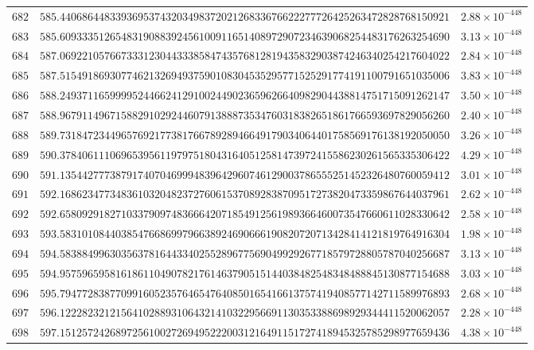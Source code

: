 \documentclass[12pt,reqno]{amsart}
\theoremstyle{remark}
\begin{document}
\begin{longtable}{clc}
$682$ & $585.4406864483393695374320349837202126833676622277726425263472828768150921$ & $2.88\times 10^{-448}$ \\
$683$ & $585.6093335126548319088392456100911651408972907234639068254483176263254690$ & $3.13\times 10^{-448}$ \\
$684$ & $587.0692210576673331230443338584743576812819435832903874246340254217604022$ & $2.84\times 10^{-448}$ \\
$685$ & $587.5154918693077462132694937590108304535295771525291774191100791651035006$ & $3.83\times 10^{-448}$ \\
$686$ & $588.2493711659999524466241291002449023659626640982904438814751715091262147$ & $3.50\times 10^{-448}$ \\
$687$ & $588.9679114967158829102924460791388873534760318382651861766593697829056260$ & $2.40\times 10^{-448}$ \\
$688$ & $589.7318472344965769217738176678928946649179034064401758569176138192050050$ & $3.26\times 10^{-448}$ \\
$689$ & $590.3784061110696539561197975180431640512581473972415586230261565335306422$ & $4.29\times 10^{-448}$ \\
$690$ & $591.1354427773879174070469994839642960746129003786555251452326480760059412$ & $3.01\times 10^{-448}$ \\
$691$ & $592.1686234773483610320482372760615370892838709517273820473359867644037961$ & $2.62\times 10^{-448}$ \\
$692$ & $592.6580929182710337909748366642071854912561989366460073547660611028330642$ & $2.58\times 10^{-448}$ \\
$693$ & $593.5831010844038547668699796638924690666190820720713428414121819764916304$ & $1.98\times 10^{-448}$ \\
$694$ & $594.5838849963035637816443340255289677569049929267718579728805787040256687$ & $3.13\times 10^{-448}$ \\
$695$ & $594.9575965958161861104907821761463790515144038482548348488845130877154688$ & $3.03\times 10^{-448}$ \\
$696$ & $595.7947728387709916052357646547640850165416613757419408577142711589976893$ & $2.68\times 10^{-448}$ \\
$697$ & $596.1222823212156410288931064321410322956691130353388698929344411520062057$ & $2.28\times 10^{-448}$ \\
$698$ & $597.1512572426897256100272694952220031216491151727418945325785298977659436$ & $4.38\times 10^{-448}$ \\

\end{longtable}
\end{document}
